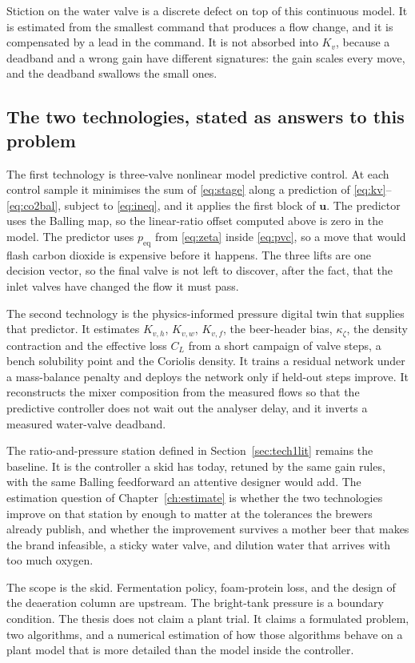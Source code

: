Stiction on the water valve is a discrete defect on top of this continuous model. It is estimated from the smallest command that produces a flow change, and it is compensated by a lead in the command. It is not absorbed into $K_v$, because a deadband and a wrong gain have different signatures: the gain scales every move, and the deadband swallows the small ones.

\subsection{The two technologies, stated as answers to this problem}

The first technology is three-valve nonlinear model predictive control. At each control sample it minimises the sum of \eqref{eq:stage} along a prediction of \eqref{eq:kv}--\eqref{eq:co2bal}, subject to \eqref{eq:ineq}, and it applies the first block of $\mathbf{u}$. The predictor uses the Balling map, so the linear-ratio offset computed above is zero in the model. The predictor uses $p_{\mathrm{eq}}$ from \eqref{eq:zeta} inside \eqref{eq:pvc}, so a move that would flash carbon dioxide is expensive before it happens. The three lifts are one decision vector, so the final valve is not left to discover, after the fact, that the inlet valves have changed the flow it must pass.

The second technology is the physics-informed pressure digital twin that supplies that predictor. It estimates $K_{v,h}$, $K_{v,w}$, $K_{v,f}$, the beer-header bias, $\kappa_{\zeta}$, the density contraction and the effective loss $C_L$ from a short campaign of valve steps, a bench solubility point and the Coriolis density. It trains a residual network under a mass-balance penalty and deploys the network only if held-out steps improve. It reconstructs the mixer composition from the measured flows so that the predictive controller does not wait out the analyser delay, and it inverts a measured water-valve deadband.

The ratio-and-pressure station defined in Section~\ref{sec:tech1lit} remains the baseline. It is the controller a skid has today, retuned by the same gain rules, with the same Balling feedforward an attentive designer would add. The estimation question of Chapter~\ref{ch:estimate} is whether the two technologies improve on that station by enough to matter at the tolerances the brewers already publish, and whether the improvement survives a mother beer that makes the brand infeasible, a sticky water valve, and dilution water that arrives with too much oxygen.

The scope is the skid. Fermentation policy, foam-protein loss, and the design of the deaeration column are upstream. The bright-tank pressure is a boundary condition. The thesis does not claim a plant trial. It claims a formulated problem, two algorithms, and a numerical estimation of how those algorithms behave on a plant model that is more detailed than the model inside the controller.
